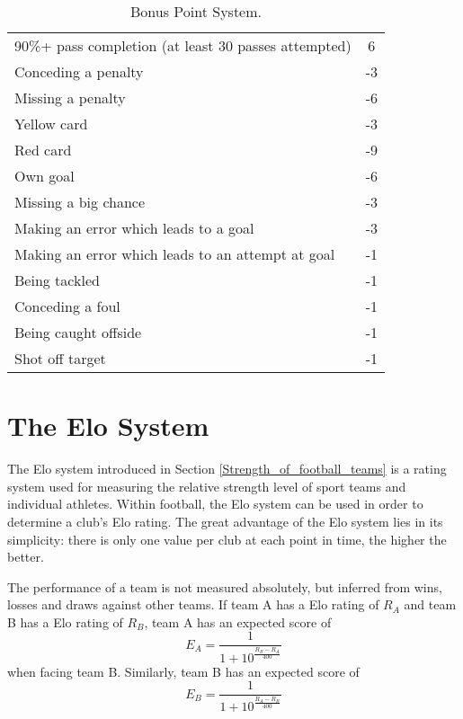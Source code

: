 \begin{table}[H]
\begin{tabular}{|l|c|}
90\%+ pass completion (at least 30 passes attempted)                     & 6   \\
Conceding a penalty                                                      & -3  \\
Missing a penalty                                                        & -6  \\
Yellow card                                                              & -3  \\
Red card                                                                 & -9  \\
Own goal                                                                 & -6  \\
Missing a big chance                                                     & -3  \\
Making an error which leads to a goal                                    & -3  \\
Making an error which leads to an attempt at goal                        & -1  \\
Being tackled                                                            & -1  \\
Conceding a foul                                                         & -1  \\
Being caught offside                                                     & -1  \\
Shot off target  \Bstrut                                                        & -1 \\
\hline
\end{tabular}
\caption{Bonus Point System.}
\end{table}



\chapter{The Elo System}\label{A2_Elo_System}


The Elo system introduced in Section \ref{Strength_of_football_teams} is a rating system used for measuring the relative strength level of sport teams and individual athletes. Within football, the Elo system can be used in order to determine a club's Elo rating. The great advantage of the Elo system lies in its simplicity: there is only one value per club at each point in time, the higher the better. 

\newpar


The performance of a team is not measured absolutely, but inferred from wins, losses and draws against other teams. If team A has a Elo rating of $R_A$ and team B has a Elo rating of $R_B$, team A has an expected score of 
\begin{equation}\label{eq5.2}
    E_A = \frac{1}{1+10^{\frac{R_B - R_A}{400}}}
\end{equation}
when facing team B. Similarly, team B has an expected score of
\begin{equation}\label{eq5.3}
    E_B = \frac{1}{1+10^{\frac{R_A - R_B}{400}}}
\end{equation}

